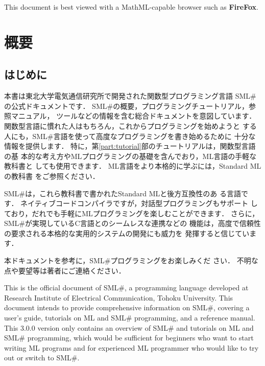 \documentclass{jbook}
\date{\today}
\title{\txt{プログラミング言語\smlsharp{}解説}{\smlsharp{} Document}}
\author{
\authors
}
\newif\ifjp
\newcommand{\txt}[2]{#1}
\newcommand{\smlsharp}{SML\#}
\newcommand{\version}{3.0.0}
\begin{document}
\maketitle

\tableofcontents


\ifjp%
{\bf FireFox}などのMathMLを表示可能なブラウザでご覧ください．
\else%
This document is best viewed with a MathML-capable browser such as {\bf FireFox}.
\fi%

%
\part{\txt{概要}{Overview}}
\label{part:outline}

\chapter{\txt{はじめに}{Preface}}

\ifjp%
	本書は東北大学電気通信研究所で開発された関数型プログラミング言語
\smlsharp{}の公式ドキュメントです．
	\smlsharp{}の概要，プログラミングチュートリアル，参照マニュアル，
ツールなどの情報を含む総合ドキュメントを意図しています．
	関数型言語に慣れた人はもちろん，これからプログラミングを始めようと
する人にも，\smlsharp{}言語を使って高度なプログラミングを書き始めるために
十分な情報を提供します．
	特に，第\ref{part:tutorial}部のチュートリアルは，関数型言語の基
本的な考え方やMLプログラミングの基礎を含んでおり，ML言語の手軽な教科書と
しても使用できます．
	ML言語をより本格的に学ぶには，Standard MLの教科書
\cite{ohori00sml}をご参照ください．
  
	\smlsharp{}は，これら教科書で書かれたStandard MLと後方互換性のあ
る言語です．
	ネイティブコードコンパイラですが，対話型プログラミングもサポート
しており，だれでも手軽にMLプログラミングを楽しむことができます．
	さらに，\smlsharp{}が実現しているC言語とのシームレスな連携などの
機能は，高度で信頼性の要求される本格的な実用的システムの開発にも威力を
発揮すると信じています． 
  
	本ドキュメントを参考に，\smlsharp{}プログラミングをお楽しみくだ
さい． 
	不明な点や要望等は著者にご連絡ください．

\else%
	This is the official document of \smlsharp{}, a programming
language developed at Research Institute of Electrical Communication,
Tohoku University.
	This document intends to provide comprehensive information on
\smlsharp{}, covering a user's guide, tutorials on ML and \smlsharp{}
programming, and a reference manual.
	This \version{} version only contains an overview of \smlsharp{}
and tutorials on ML and \smlsharp{} programming, which would be
sufficient for beginners who want to start writing ML programs and
for experienced ML programmer who would like to try out or switch to
\smlsharp{}.
\end{document}
